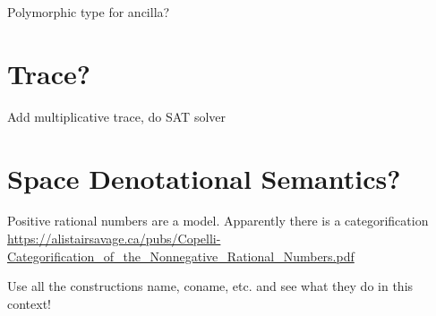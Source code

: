 \documentclass[sigplan,10pt,review,anonymous]{acmart}
\begin{document}
Polymorphic type for ancilla?

\section{Trace?}
  
Add multiplicative trace, do SAT solver

\section{Space Denotational Semantics?}
  
Positive rational numbers are a model. Apparently there is a
categorification
\url{https://alistairsavage.ca/pubs/Copelli-Categorification_of_the_Nonnegative_Rational_Numbers.pdf}

Use all the constructions name, coname, etc. and see what they do in this context!


\end{document}
